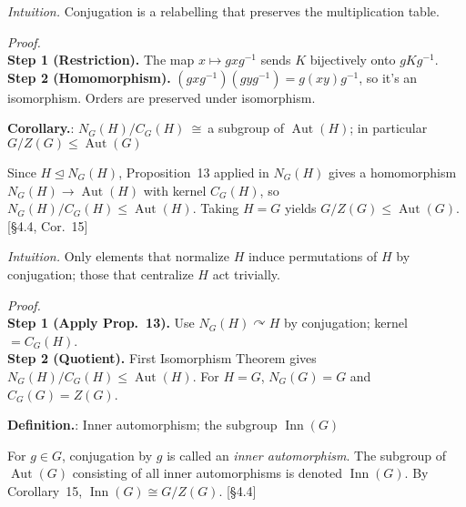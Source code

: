 \documentclass[12pt]{article}
\theoremstyle{definition}
\newcommand{\Aut}{\operatorname{Aut}}
\newcommand{\Inn}{\operatorname{Inn}}
\begin{document}
\dotfill

\emph{Intuition.} Conjugation is a relabelling that preserves the multiplication table.

\dotfill

\emph{Proof.}\\
\textbf{Step 1 (Restriction).} The map $x\mapsto gxg^{-1}$ sends $K$ bijectively onto $gKg^{-1}$.\\
\textbf{Step 2 (Homomorphism).} $(gxg^{-1})(gyg^{-1})=g(xy)g^{-1}$, so it’s an isomorphism. Orders are preserved under isomorphism.\\

\newpage


\noindent\textbf{Corollary.}: $N_G(H)/C_G(H)\ \cong\ $a subgroup of $\Aut(H)$; in particular $G/Z(G)\le \Aut(G)$

\newpage

Since $H\trianglelefteq N_G(H)$, Proposition~13 applied in $N_G(H)$ gives a homomorphism $N_G(H)\to\Aut(H)$ with kernel $C_G(H)$, so $N_G(H)/C_G(H)\le \Aut(H)$. Taking $H=G$ yields $G/Z(G)\le \Aut(G)$. \hfill {\footnotesize [§4.4, Cor.~15]}\\

\dotfill

\emph{Intuition.} Only elements that normalize $H$ induce permutations of $H$ by conjugation; those that centralize $H$ act trivially.

\dotfill

\emph{Proof.}\\
\textbf{Step 1 (Apply Prop.~13).} Use $N_G(H)\curvearrowright H$ by conjugation; kernel $=C_G(H)$.\\
\textbf{Step 2 (Quotient).} First Isomorphism Theorem gives $N_G(H)/C_G(H)\le \Aut(H)$. For $H=G$, $N_G(G)=G$ and $C_G(G)=Z(G)$.\\

\newpage


\noindent\textbf{Definition.}: Inner automorphism; the subgroup $\Inn(G)$

\newpage

For $g\in G$, conjugation by $g$ is called an \emph{inner automorphism}. The subgroup of $\Aut(G)$ consisting of all inner automorphisms is denoted $\Inn(G)$. By Corollary~15, $\Inn(G)\cong G/Z(G)$. \hfill {\footnotesize [§4.4]}\\
\end{document}
